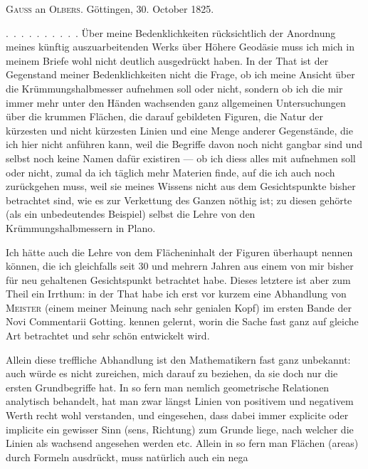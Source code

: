 \par{}
\begin{center}\textsc{Gauss} an \textsc{Olbers}. Göttingen, 30. October 1825.\end{center}
\indent\mbox{. . . . . . . . . .} Über meine Bedenklichkeiten rücksichtlich der Anordnung meines künftig auszuarbeitenden Werks über Höhere Geodäsie muss ich mich in meinem Briefe wohl nicht deutlich ausgedrückt haben. In der That ist der Gegenstand meiner Bedenklichkeiten nicht die Frage, ob ich meine Ansicht über die Krümmungshalbmesser aufnehmen soll oder nicht, sondern ob ich die mir immer mehr unter den Händen wachsenden ganz allgemeinen Untersuchungen über die krummen Flächen, die darauf gebildeten Figuren, die Natur der kürzesten und nicht kürzesten Linien und eine Menge anderer Gegenstände, die ich hier nicht anführen kann, weil die Begriffe davon noch nicht gangbar sind und selbst noch keine Namen dafür existiren --- ob ich diess alles mit aufnehmen soll oder nicht, zumal da ich täglich mehr Materien finde, auf die ich auch noch zurückgehen muss, weil sie meines Wissens nicht aus dem Gesichtspunkte bisher betrachtet sind, wie es zur Verkettung des Ganzen nöthig ist; zu diesen gehörte (als ein unbedeutendes Beispiel) selbst die Lehre von den Krümmungshalbmessern in Plano.

Ich hätte auch die Lehre von dem Flächeninhalt der Figuren überhaupt nennen können, die ich gleichfalls seit 30 und mehrern Jahren aus einem von mir bisher für neu gehaltenen Gesichtspunkt betrachtet habe. Dieses letztere ist aber zum Theil ein Irrthum: in der That habe ich erst vor kurzem eine Abhandlung von \textsc{Meister} (einem meiner Meinung nach sehr genialen Kopf) im ersten Bande der Novi Commentarii Gotting. kennen gelernt, worin die Sache fast ganz auf gleiche Art betrachtet und sehr schön entwickelt wird.

Allein diese treffliche Abhandlung ist den Mathematikern fast ganz unbekannt: auch würde es nicht zureichen, mich darauf zu beziehen, da sie doch nur die ersten Grundbegriffe hat. In so fern man nemlich geometrische Relationen analytisch behandelt, hat man zwar längst Linien von positivem und negativem Werth recht wohl verstanden, und eingesehen, dass dabei immer explicite oder implicite ein gewisser Sinn (sens, Richtung) zum Grunde liege, nach welcher die Linien als wachsend angesehen werden etc. Allein in so fern man Flächen (areas) durch Formeln ausdrückt, muss natürlich auch ein nega%
